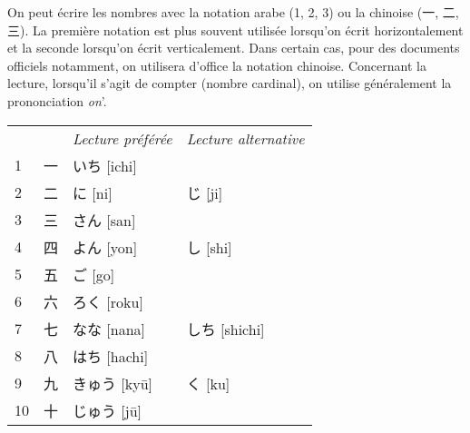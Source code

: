 \documentclass[a4paper,11pt,final]{article}
\newcommand{\sectit}[1]{\bigskip\hspace{-5mm}{\color{sectionblue}$\blacksquare$~~\Large\bfseries #1}}
\newcommand{\romaji}[1]{{\footnotesize[#1]}}
\begin{document}

\vspace{15mm}
	

On peut écrire les nombres avec la notation arabe (1, 2, 3) ou la chinoise (一, 二, 三). La première notation est plus souvent utilisée lorsqu'on écrit horizontalement et la seconde lorsqu'on écrit verticalement. Dans certain cas, pour des documents officiels notamment, on utilisera d'office la notation chinoise. Concernant la lecture, lorsqu'il s'agit de compter (nombre cardinal), on utilise généralement la prononciation \textit{on}'.


\sectit{De 1 à 10}
	
\hspace{5mm}\begin{tabular}{|p{1.5cm}p{1.5cm}p{3cm}p{3cm}}
	\multicolumn{1}{l}{}&& \it\small Lecture préférée & \it\small Lecture alternative \\
	1		& 一			& いち \romaji{ichi} \\
	2		& 二			& に	 \romaji{ni}		& じ \romaji{ji} \\
	3		& 三			& さん \romaji{san} \\
	4		& 四			& よん \romaji{yon}		& し \romaji{shi} \\
	5		& 五			& ご \romaji{go} \\
	6		& 六			& ろく \romaji{roku} \\
	7		& 七			& なな \romaji{nana}		& しち \romaji{shichi} \\
	8		& 八			& はち \romaji{hachi} \\
	9		& 九			& きゅう \romaji{ky\=u}	& く \romaji{ku} \\
	10		& 十			& じゅう \romaji{j\=u}
\end{tabular}
\end{document}
